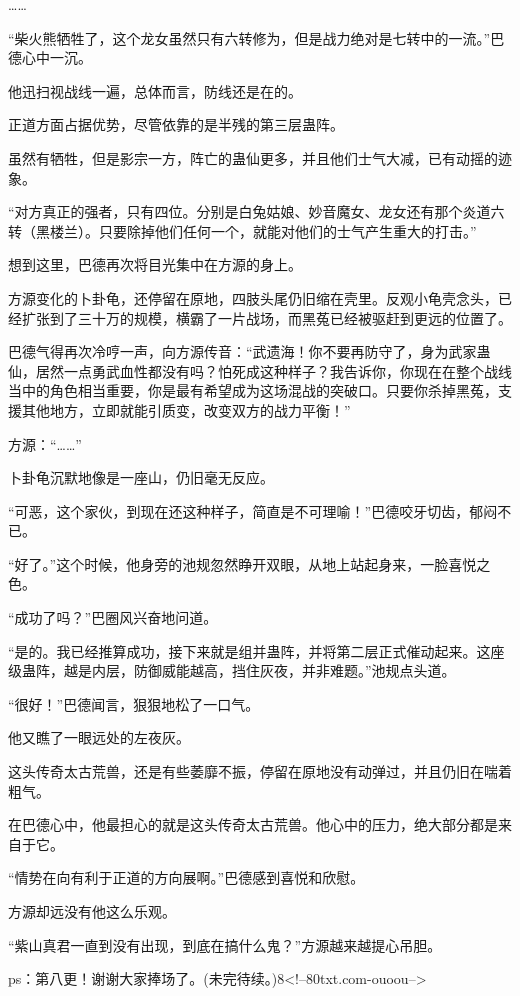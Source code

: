 \begin{this_body}
……

“柴火熊牺牲了，这个龙女虽然只有六转修为，但是战力绝对是七转中的一流。”巴德心中一沉。

他迅扫视战线一遍，总体而言，防线还是在的。

正道方面占据优势，尽管依靠的是半残的第三层蛊阵。

虽然有牺牲，但是影宗一方，阵亡的蛊仙更多，并且他们士气大减，已有动摇的迹象。

“对方真正的强者，只有四位。分别是白兔姑娘、妙音魔女、龙女还有那个炎道六转（黑楼兰）。只要除掉他们任何一个，就能对他们的士气产生重大的打击。”

想到这里，巴德再次将目光集中在方源的身上。

方源变化的卜卦龟，还停留在原地，四肢头尾仍旧缩在壳里。反观小龟壳念头，已经扩张到了三十万的规模，横霸了一片战场，而黑菟已经被驱赶到更远的位置了。

巴德气得再次冷哼一声，向方源传音：“武遗海！你不要再防守了，身为武家蛊仙，居然一点勇武血性都没有吗？怕死成这种样子？我告诉你，你现在在整个战线当中的角色相当重要，你是最有希望成为这场混战的突破口。只要你杀掉黑菟，支援其他地方，立即就能引质变，改变双方的战力平衡！”

方源：“……”

卜卦龟沉默地像是一座山，仍旧毫无反应。

“可恶，这个家伙，到现在还这种样子，简直是不可理喻！”巴德咬牙切齿，郁闷不已。

“好了。”这个时候，他身旁的池规忽然睁开双眼，从地上站起身来，一脸喜悦之色。

“成功了吗？”巴圈风兴奋地问道。

“是的。我已经推算成功，接下来就是组并蛊阵，并将第二层正式催动起来。这座级蛊阵，越是内层，防御威能越高，挡住灰夜，并非难题。”池规点头道。

“很好！”巴德闻言，狠狠地松了一口气。

他又瞧了一眼远处的左夜灰。

这头传奇太古荒兽，还是有些萎靡不振，停留在原地没有动弹过，并且仍旧在喘着粗气。

在巴德心中，他最担心的就是这头传奇太古荒兽。他心中的压力，绝大部分都是来自于它。

“情势在向有利于正道的方向展啊。”巴德感到喜悦和欣慰。

方源却远没有他这么乐观。

“紫山真君一直到没有出现，到底在搞什么鬼？”方源越来越提心吊胆。

ps：第八更！谢谢大家捧场了。(未完待续。)8<!--80txt.com-ouoou-->

\end{this_body}

